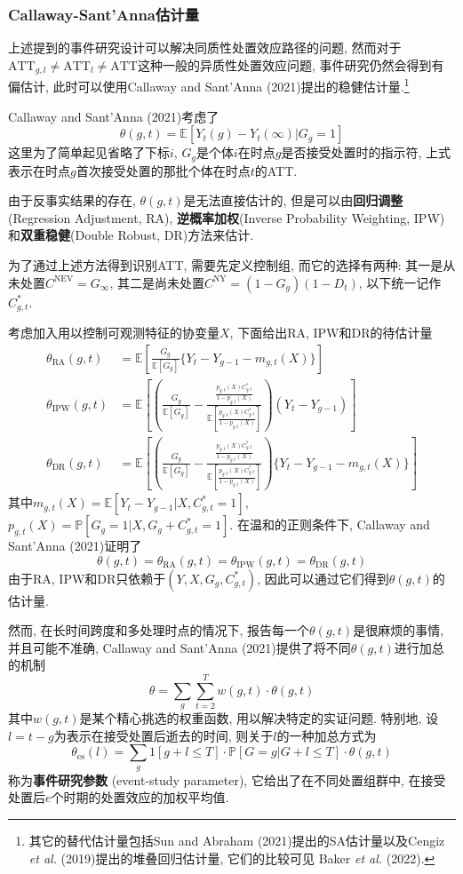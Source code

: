 \documentclass[cn,blue,14pt,screen,bibstyle=gb7714-2015]{elegantnote}
\newcommand{\E}{\mathbb{E}}
\newcommand{\X}{X}
\begin{document}
\subsubsection{Callaway-Sant'Anna估计量}
上述提到的事件研究设计可以解决同质性处置效应路径的问题, 然而对于$\text{ATT}_{g,l}\neq\text{ATT}_l\ne\text{ATT}$这种一般的异质性处置效应问题, 事件研究仍然会得到有偏估计, 此时可以使用Callaway and Sant'Anna (2021)提出的稳健估计量.\footnote{其它的替代估计量包括Sun and Abraham (2021)提出的SA估计量以及Cengiz \emph{et al.} (2019)提出的堆叠回归估计量, 它们的比较可见 Baker \emph{et al.} (2022).}

Callaway and Sant'Anna (2021)考虑了
$$\theta(g,t)=\E[Y_{t}(g)-Y_{t}(\infty)|G_g=1]$$
这里为了简单起见省略了下标$i$, $G_g$是个体$i$在时点$g$是否接受处置时的指示符, 上式表示在时点$g$首次接受处置的那批个体在时点$t$的ATT.

由于反事实结果的存在, $\theta(g,t)$是无法直接估计的, 但是可以由\textbf{回归调整}(Regression Adjustment, RA), \textbf{逆概率加权}(Inverse Probability Weighting, IPW)和\textbf{双重稳健}(Double Robust, DR)方法来估计.

为了通过上述方法得到识别ATT, 需要先定义控制组, 而它的选择有两种: 其一是从未处置$C^\text{NEV}=G_\infty$, 其二是尚未处置$C^\text{NY}=(1-G_g)(1-D_t)$, 以下统一记作$C_{g,t}^\ast$.

考虑加入用以控制可观测特征的协变量$\X$, 下面给出RA, IPW和DR的待估计量
\begin{align*}
\theta_\text{RA}(g,t)&=\E\left[\frac{G_g}{\E[G_g]}\{Y_t-Y_{g-1}-m_{g,t}({X})\}\right] \\
\theta_\text{IPW}(g,t)&=\E\left[\left(\frac{G_g}{\E[G_g]}-\frac{\frac{p_{g,t}(\X)C_{g,t}^\ast}{1-p_{g,t}(\X)}}{\E\left[\frac{p_{g,t}(\X)C_{g,t}^\ast}{1-p_{g,t}(\X)}\right]}\right)(Y_t-Y_{g-1})\right] \\
\theta_{\text{DR}}(g,t)&=\E\left[\left(\frac{G_g}{\E[G_g]}-\frac{\frac{p_{g,t}(\X)C_{g,t}^\ast}{1-p_{g,t}(\X)}}{\E\left[\frac{p_{g,t}(\X)C_{g,t}^\ast}{1-p_{g,t}(\X)}\right]}\right)\{Y_t-Y_{g-1}-m_{g,t}(\X)\}\right]
\end{align*}
其中$m_{g,t}(X)=\E[Y_t-Y_{g-1}|X,C_{g,t}^\ast=1]$, $p_{g,t}(X)=\mathbb{P}[G_g=1|X,G_g+C_{g,t}^\ast=1]$. 在温和的正则条件下, Callaway and Sant'Anna (2021)证明了
$$\theta(g,t)=\theta_\text{RA}(g,t)=\theta_\text{IPW}(g,t)=\theta_\text{DR}(g,t)$$
由于RA, IPW和DR只依赖于$(Y,X,G_g,C_{g,t}^\ast)$, 因此可以通过它们得到$\theta(g,t)$的估计量.

然而, 在长时间跨度和多处理时点的情况下, 报告每一个$\theta(g,t)$是很麻烦的事情, 并且可能不准确, Callaway and Sant'Anna (2021)提供了将不同$\theta(g,t)$进行加总的机制
$$\theta=\sum_g\sum_{t=2}^Tw(g,t)\cdot\theta(g,t)$$
其中$w(g,t)$是某个精心挑选的权重函数, 用以解决特定的实证问题. 特别地, 设$l=t-g$为表示在接受处置后逝去的时间, 则关于$l$的一种加总方式为
$$\theta_{\text{es}}(l)=\sum_g1[g+l\leq T]\cdot\mathbb{P}[G=g|G+l\leq T]\cdot\theta(g,t)$$
称为\textbf{事件研究参数} (event-study parameter), 它给出了在不同处置组群中, 在接受处置后$e$个时期的处置效应的加权平均值.
\end{document}
